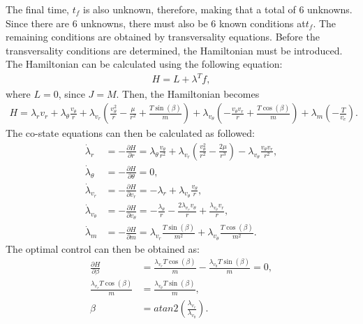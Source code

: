 \documentclass[]{article}
\begin{document}
The final time, \(t_f\) is also unknown, therefore, making that a total of 6 unknowns. Since there are 6 unknowns, there must also be 6 known conditions at\(t_f\). The remaining conditions are obtained by transversality equations. Before the transversality conditions are determined, the Hamiltonian must be introduced. The Hamiltonian can be calculated using the following equation:
\begin{align}
	H = L + \lambda^{T}f,
\end{align}
where \(L = 0\), since \(J = M\). Then, the Hamiltonian becomes
\begin{align*}
	H = \lambda_{r}v_r + \lambda_{\theta}\frac{v_\theta}{r} + \lambda_{v_r}(\frac{v^2_{\theta}}{r} - \frac{\mu}{r^2} + \frac{T\sin(\beta)}{m}) + \lambda_{v_\theta}(-\frac{v_{\theta}v_{r}}{r}   + \frac{T\cos(\beta)}{m}) +\lambda_m(-\frac{T}{v_e}).
\end{align*}
The co-state equations can then be calculated as followed:
\begin{align}
	\dot{\lambda}_r      &= -\frac{\partial{H}}{\partial{r}} = \lambda_\theta\frac{v_\theta}{r^2} + \lambda_{v_r}(\frac{v_{\theta}^2}{r^2} - \frac{2\mu}{r^3})-\lambda_{v_\theta}\frac{v_{\theta}v_r}{r^2}, \label{lamdotr} \\
	\dot{\lambda}_\theta &= -\frac{\partial{H}}{\partial{\theta}} = 0,                                                                                                     \label{lamdottheta} \\
	\dot{\lambda}_{v_r}  &=  -\frac{\partial{H}}{\partial{v_r}} = -\lambda_r + \lambda_{v_\theta}\frac{v_\theta}{r},                                                       \label{lamdotvr}    \\
	\dot{\lambda}_{v_\theta} &=  -\frac{\partial{H}}{\partial{v_\theta}} = -\frac{\lambda_\theta}{r} - \frac{2\lambda_{v_r}v_\theta}{r} + \frac{\lambda_{v_\theta}v_r}{r}, \label{lamdotvtheta}\\
    \dot{\lambda}_m          &=  -\frac{\partial{H}}{\partial{m}} = \lambda_{v_r}\frac{T\sin(\beta)}{m^2} + \lambda_{v_\theta}\frac{T\cos(\beta)}{m^2}.                      \label{lamdotm}
\end{align}
The optimal control can then be obtained as:
\begin{align}
	\frac{\partial H}{\partial \beta} &= \frac{\lambda_{v_r}T\cos(\beta)}{m} - \frac{\lambda_{v_\theta}T\sin(\beta)}{m} = 0, \nonumber\\
	\frac{\lambda_{v_r}T\cos(\beta)}{m} &= \frac{\lambda_{v_\theta}T\sin(\beta)}{m}, \nonumber\\
	\beta &= atan2(\frac{\lambda_{v_r}}{\lambda_{v_\theta}}) \label{control}.
\end{align}
\end{document}
